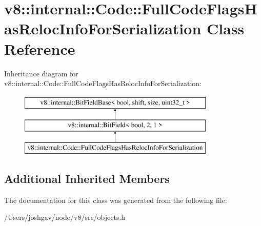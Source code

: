 \hypertarget{classv8_1_1internal_1_1_code_1_1_full_code_flags_has_reloc_info_for_serialization}{}\section{v8\+:\+:internal\+:\+:Code\+:\+:Full\+Code\+Flags\+Has\+Reloc\+Info\+For\+Serialization Class Reference}
\label{classv8_1_1internal_1_1_code_1_1_full_code_flags_has_reloc_info_for_serialization}
Inheritance diagram for v8\+:\+:internal\+:\+:Code\+:\+:Full\+Code\+Flags\+Has\+Reloc\+Info\+For\+Serialization\+:\begin{figure}[H]
\begin{center}
\leavevmode
\includegraphics[height=3.000000cm]{classv8_1_1internal_1_1_code_1_1_full_code_flags_has_reloc_info_for_serialization}
\end{center}
\end{figure}
\subsection*{Additional Inherited Members}


The documentation for this class was generated from the following file\+:\begin{DoxyCompactItemize}
\item 
/\+Users/joshgav/node/v8/src/objects.\+h\end{DoxyCompactItemize}
